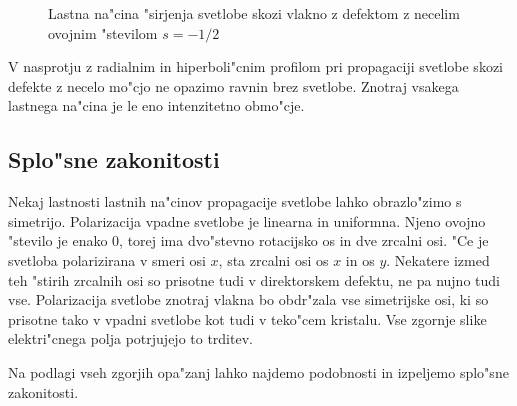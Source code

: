 \documentclass[a4paper,10pt]{article}
\begin{document}
\begin{figure}[!htbp]
 \centering
 \caption{Lastna na"cina "sirjenja svetlobe skozi vlakno z defektom z necelim ovojnim "stevilom $s=-1/2$}
 \label{fig:pulse-m12-mode}
\end{figure}

V nasprotju z radialnim in hiperboli"cnim profilom pri propagaciji svetlobe skozi defekte z necelo mo"cjo ne opazimo ravnin brez svetlobe. 
Znotraj vsakega lastnega na"cina je le eno intenzitetno obmo"cje. 

\subsection{Splo"sne zakonitosti}
Nekaj lastnosti lastnih na"cinov propagacije svetlobe lahko obrazlo"zimo s simetrijo. 
Polarizacija vpadne svetlobe je linearna in uniformna. 
Njeno ovojno "stevilo je enako 0, torej ima dvo"stevno rotacijsko os in dve zrcalni osi. 
"Ce je svetloba polarizirana v smeri osi $x$, sta zrcalni osi os $x$ in os $y$. 
Nekatere izmed teh "stirih zrcalnih osi so prisotne tudi v direktorskem defektu, ne pa nujno tudi vse. 
Polarizacija svetlobe znotraj vlakna bo obdr"zala vse simetrijske osi, ki so prisotne tako v vpadni svetlobe kot tudi v teko"cem kristalu. 
Vse zgornje slike elektri"cnega polja potrjujejo to trditev. 

Na podlagi vseh zgorjih opa"zanj lahko najdemo podobnosti in izpeljemo splo"sne zakonitosti. 
\end{document}
